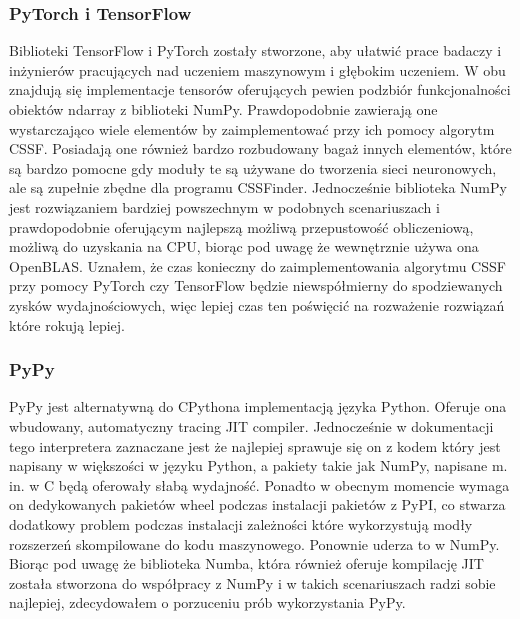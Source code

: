 \documentclass[11pt, a4paper]{article}
\begin{document}
\begin{sloppypar}
    \subsubsection{PyTorch i TensorFlow}
    Biblioteki TensorFlow i PyTorch zostały stworzone, aby ułatwić prace badaczy i inżynierów
    pracujących nad uczeniem maszynowym i głębokim uczeniem. W obu znajdują się
    implementacje tensorów oferujących pewien podzbiór funkcjonalności obiektów ndarray
    z biblioteki NumPy. Prawdopodobnie zawierają one wystarczająco wiele elementów by zaimplementować
    przy ich pomocy algorytm CSSF. Posiadają one również bardzo rozbudowany bagaż innych
    elementów, które są bardzo pomocne gdy moduły te są używane do tworzenia sieci neuronowych,
    ale są zupełnie zbędne dla programu CSSFinder. Jednocześnie biblioteka NumPy jest rozwiązaniem
    bardziej powszechnym w podobnych scenariuszach i prawdopodobnie oferującym najlepszą
    możliwą przepustowość obliczeniową, możliwą do uzyskania na CPU, biorąc pod uwagę że
    wewnętrznie używa ona OpenBLAS. Uznałem, że czas konieczny do zaimplementowania algorytmu
    CSSF przy pomocy PyTorch czy TensorFlow będzie niewspółmierny do spodziewanych zysków
    wydajnościowych, więc lepiej czas ten poświęcić na rozważenie rozwiązań które rokują
    lepiej.

    \subsubsection{PyPy}
    PyPy jest alternatywną do CPythona implementacją języka Python. Oferuje ona wbudowany,
    automatyczny tracing JIT compiler. Jednocześnie w dokumentacji tego interpretera zaznaczane
    jest że najlepiej sprawuje się on z kodem który jest napisany w większości w języku Python,
    a pakiety takie jak NumPy, napisane m. in. w C będą oferowały słabą wydajność\cite{PyPyPerformance}.
    Ponadto w obecnym momencie wymaga on dedykowanych pakietów wheel podczas instalacji pakietów
    z PyPI, co stwarza dodatkowy problem podczas instalacji zależności które
    wykorzystują modły rozszerzeń skompilowane do kodu maszynowego. Ponownie uderza to w
    NumPy. Biorąc pod uwagę że biblioteka Numba, która również oferuje kompilację JIT została
    stworzona do współpracy z NumPy i w takich scenariuszach radzi sobie najlepiej,
    zdecydowałem o porzuceniu prób wykorzystania PyPy.


\end{sloppypar}
\end{document}
